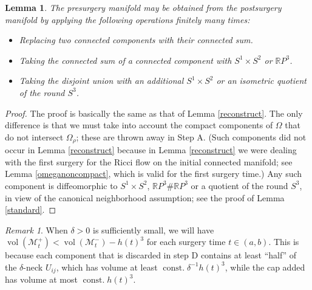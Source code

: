 \documentclass[12pt]{amsart}
\newcommand{\const}{\operatorname{const.}}
\newcommand{\M}{{\mathcal M}}
\newcommand{\R}{{\mathbb R}}
\newcommand{\vol}{\operatorname{vol}}
\newcommand{\de}{\delta}
\numberwithin{equation}{section}
\theoremstyle{plain}
\newtheorem{lemma}[equation]{Lemma}
\theoremstyle{definition}
\theoremstyle{remark}
\newtheorem{remark}[equation]{Remark}
\begin{document}
\begin{lemma} \label{reconstruct2}
The presurgery manifold may be obtained
from the postsurgery manifold by applying the following
operations finitely many times:

\begin{itemize}
\item Replacing two connected components with their connected sum.
\item Taking the connected sum of a connected component 
with  $S^1\times S^2$ or $\R P^3$. 
\item Taking the disjoint union with an additional 
$S^1 \times S^2$ or an isometric quotient of the round $S^3$.
\end{itemize} 
\end{lemma}
\begin{proof}
The proof is basically the same as that of Lemma \ref{reconstruct}. The only
difference is that we must take
into account the compact components of $\Omega$ that do not intersect
$\Omega_\rho$; these are thrown away in Step A. 
(Such components did not occur in Lemma \ref{reconstruct} because
in Lemma \ref{reconstruct} we were dealing with the first surgery for
the Ricci flow on the initial connected manifold; 
see Lemma \ref{omeganoncompact}, which is valid for the first surgery time.)
Any such component is
diffeomorphic to 
$S^1 \times S^2$, $\R P^3 \# \R P^3$ or
a quotient of the round $S^3$, in view of the canonical
neighborhood assumption; see the proof of Lemma \ref{standard}. 
\end{proof}

\begin{remark}
\label{volumelossremark}
When $\de>0$ is sufficiently small, we will have 
$\vol(\M_t^+)<\vol(\M_t^-)-h(t)^3$
for each surgery time $t\in (a,b)$.
This is because each component that is discarded in step D contains
at least
``half'' of the $\de$-neck $U_{ij}$, which has volume at least $\const \de^{-1}
h(t)^3$,
while the cap added has volume at most $\const h(t)^3$.
\end{remark}
\end{document}
